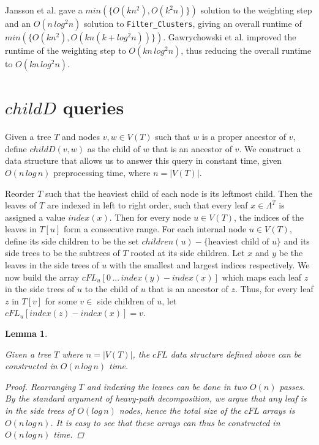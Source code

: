 \documentclass{article}
\newcommand{\leafset}{\Lambda}
\newtheorem{cfddatastructure}[incompatibility]{Lemma}
\begin{document}
    Jansson et al. \cite{jansson2018algorithms} gave a $min(\{O(kn^2), O(k^2n)\})$ solution to the weighting step and an $O(n\,log^2n)$ solution to \texttt{Filter\_Clusters}, giving an overall runtime of $min(\{O(kn^2), O(kn(k + log^2n))\})$. Gawrychowski et al. \cite{gawrychowski2017faster} improved the runtime of the weighting step to $O(kn\,log^2n)$, thus reducing the overall runtime to $O(kn\,log^2n)$.

    \section{$childD$ queries}
    \label{sec:cfd}

    Given a tree $T$ and nodes $v, w \in V(T)$ such that $w$ is a proper ancestor of $v$, define $childD(v, w)$ as the child of $w$ that is an ancestor of $v$. We construct a data structure that allows us to answer this query in constant time, given $O(n\,log\,n)$ preprocessing time, where $n = |V(T)|$.

    Reorder $T$ such that the heaviest child of each node is its leftmost child. Then the leaves of $T$ are indexed in left to right order, such that every leaf $x \in \leafset^T$ is assigned a value $index(x)$. Then for every node $u \in V(T)$, the indices of the leaves in $T[u]$ form a consecutive range. For each internal node $u \in V(T)$, define its side children to be the set $children(u) - \{\text{heaviest child of }u\}$ and its side trees to be the subtrees of $T$ rooted at its side children. Let $x$ and $y$ be the leaves in the side trees of $u$ with the smallest and largest indices respectively. We now build the array $cFL_u[0\, ...\, index(y) - index(x)]$ which maps each leaf $z$ in the side trees of $u$ to the child of $u$ that is an ancestor of $z$. Thus, for every leaf $z$ in $T[v]$ for some $v \in$ side children of $u$, let $cFL_u[index(z) - index(x)] = v$.
    \newline

    \begin{cfddatastructure}
        \label{lem:cfddatastructure}

        Given a tree $T$ where $n = |V(T)|$, the $cFL$ data structure defined above can be constructed in $O(n\,log\,n)$ time.

        \begin{proof}
            Rearranging $T$ and indexing the leaves can be done in two $O(n)$ passes. By the standard argument of heavy-path decomposition, we argue that any leaf is in the side trees of $O(log\,n)$ nodes, hence the total size of the $cFL$ arrays is $O(n\,log\,n)$. It is easy to see that these arrays can thus be constructed in $O(n\,log\,n)$ time.
        \end{proof}
    \end{cfddatastructure}
\end{document}
